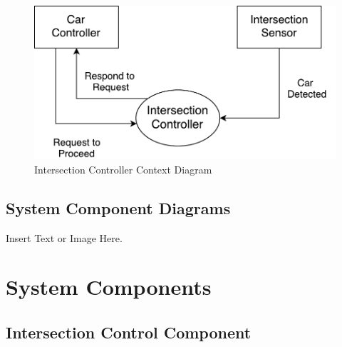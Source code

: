 \documentclass [10pt]{article}
\begin{document}
\break

\begin{figure} [h!]
	\caption{Intersection Controller Context Diagram} \bigskip
	\centering
	\includegraphics [scale = 0.8] {figures/IC_ContextDiagram.pdf}

\end{figure}

\subsection{System Component Diagrams}
Insert Text or Image Here. 





\section{System Components}
 
\subsection{Intersection Control Component}
\end{document}
